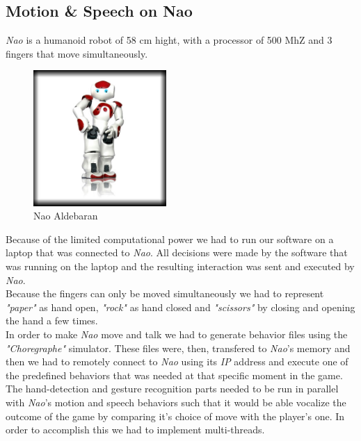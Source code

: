 \documentclass[a4paper, 11pt, twocolumn]{article}
\begin{document}
        \subsection{Motion \& Speech on Nao}
		\label{sec:Meth_naoPlay}
		\emph{Nao} is a humanoid robot of 58 cm hight, with a processor of 500 MhZ and 3 fingers that move simultaneously.\\
		\begin{figure}[!hbtp]
		 	\centering
			\includegraphics[width=0.45\textwidth]{Nao.png}
		 	\caption{Nao Aldebaran}
	   	\end{figure}			
		\hspace*{10px}Because of the limited computational power we had to run our software on a laptop that was connected to \emph{Nao}. All decisions were made by the software that was running on the laptop and the resulting interaction was sent and executed by \emph{Nao}.\\
		\hspace*{10px}Because the fingers can only be moved simultaneously we had to represent \emph{"paper"} as hand open, \emph{"rock"} as hand closed and \emph{"scissors"} by closing and opening the hand a few times.\\
		\hspace*{10px}In order to make \emph{Nao} move and talk we had to generate behavior files using the \emph{"Choregraphe"} simulator. These files were, then, transfered to \emph{Nao}\rq s memory and then we had to remotely connect to \emph{Nao} using its \emph{IP} address and execute one of the predefined behaviors that was needed at that specific moment in the game.\\  
        \hspace*{10px}The hand-detection and gesture recognition parts needed to be run in parallel with \emph{Nao}\rq s motion and speech behaviors such that it would be able vocalize the outcome of the game by comparing it\rq s choice of move with the player\rq s one. In order to accomplish this we had to implement multi-threads.
\end{document}
